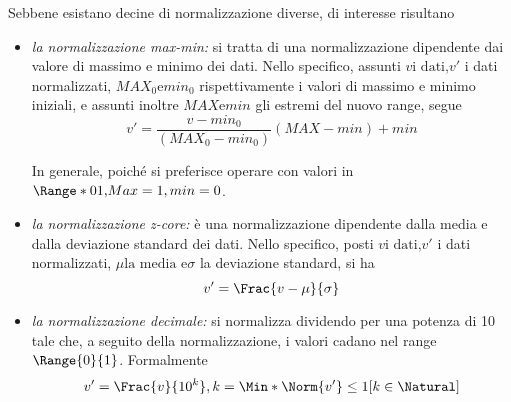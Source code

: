\documentclass{subfiles}
\begin{document}
Sebbene esistano decine di normalizzazione diverse, di interesse risultano
\begin{itemize}
    \item \emph{la normalizzazione max-min:} si tratta di una normalizzazione dipendente dai valore di massimo e minimo dei dati.
          Nello specifico, assunti \(v \text{i dati,} v' \) i dati normalizzati, \(MAX_{0} \text{e} min_{0}\) rispettivamente i valori di massimo e minimo iniziali,
          e assunti inoltre \(MAX \text{e} min\) gli estremi del nuovo range, segue
          \[
              v' = \frac{v - min_{0}}{(MAX_{0} - min_{0})}(MAX - min) + min
          \]
          \begin{MarginNote}
              In generale, poiché si preferisce operare con valori in \(\Range*{0}{1} \text{,} Max = 1, min = 0\).
          \end{MarginNote}
    \item \emph{la normalizzazione z-core:} è una normalizzazione dipendente dalla media e dalla deviazione standard dei dati.
          Nello specifico, posti \(v \text{i dati,} v'\) i dati normalizzati, \(\mu \text{la media e} \sigma\) la deviazione standard, si ha
          \[
              v' = \Frac{v - \mu}{\sigma}
          \]
    \item \emph{la normalizzazione decimale:} si normalizza dividendo per una potenza di 10 tale che,
          a seguito della normalizzazione, i valori cadano nel range \(\Range{0}{1}\).
          Formalmente
          \[
              v' = \Frac{v}{10^{k}}, k = \Min*{\Norm{v'} \le 1}[k \in \Natural]
          \]
\end{itemize}
\end{document}
